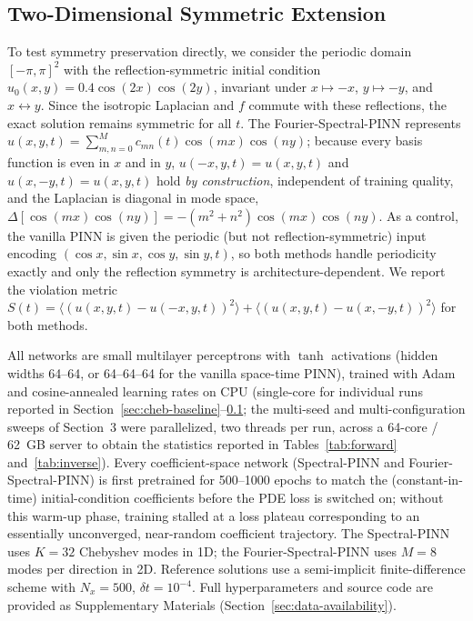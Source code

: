\documentclass[symmetry,article,submit,moreauthors]{Definitions/mdpi}
\begin{document}
\subsection{Two-Dimensional Symmetric Extension}\label{sec:2d}

To test symmetry preservation directly, we consider the periodic domain $[-\pi,\pi]^2$ with the reflection-symmetric initial condition $u_0(x,y)=0.4\cos(2x)\cos(2y)$, invariant under $x\mapsto-x$, $y\mapsto-y$, and $x\leftrightarrow y$. Since the isotropic Laplacian and $f$ commute with these reflections, the exact solution remains symmetric for all $t$. The Fourier-Spectral-PINN represents $u(x,y,t)=\sum_{m,n=0}^{M}c_{mn}(t)\cos(mx)\cos(ny)$; because every basis function is even in $x$ and in $y$, $u(-x,y,t)=u(x,y,t)$ and $u(x,-y,t)=u(x,y,t)$ hold \emph{by construction}, independent of training quality, and the Laplacian is diagonal in mode space, $\Delta[\cos(mx)\cos(ny)]=-(m^2+n^2)\cos(mx)\cos(ny)$. As a control, the vanilla PINN is given the periodic (but not reflection-symmetric) input encoding $(\cos x,\sin x,\cos y,\sin y,t)$, so both methods handle periodicity exactly and only the reflection symmetry is architecture-dependent. We report the violation metric $S(t)=\langle(u(x,y,t)-u(-x,y,t))^2\rangle+\langle(u(x,y,t)-u(x,-y,t))^2\rangle$ for both methods.

All networks are small multilayer perceptrons with $\tanh$ activations (hidden widths 64--64, or 64--64--64 for the vanilla space-time PINN), trained with Adam and cosine-annealed learning rates on CPU (single-core for individual runs reported in Section~\ref{sec:cheb-baseline}--\ref{sec:2d}; the multi-seed and multi-configuration sweeps of Section~3 were parallelized, two threads per run, across a 64-core / 62~GB server to obtain the statistics reported in Tables~\ref{tab:forward} and~\ref{tab:inverse}). Every coefficient-space network (Spectral-PINN and Fourier-Spectral-PINN) is first pretrained for 500--1000 epochs to match the (constant-in-time) initial-condition coefficients before the PDE loss is switched on; without this warm-up phase, training stalled at a loss plateau corresponding to an essentially unconverged, near-random coefficient trajectory. The Spectral-PINN uses $K=32$ Chebyshev modes in 1D; the Fourier-Spectral-PINN uses $M=8$ modes per direction in 2D. Reference solutions use a semi-implicit finite-difference scheme with $N_x=500$, $\delta t=10^{-4}$. Full hyperparameters and source code are provided as Supplementary Materials (Section~\ref{sec:data-availability}).
\end{document}
